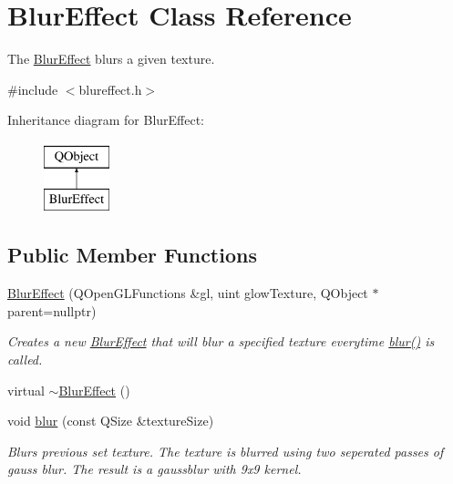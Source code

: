 \hypertarget{class_blur_effect}{\section{Blur\+Effect Class Reference}
\label{class_blur_effect}
}


The \hyperlink{class_blur_effect}{Blur\+Effect} blurs a given texture.  




{\ttfamily \#include $<$blureffect.\+h$>$}

Inheritance diagram for Blur\+Effect\+:\begin{figure}[H]
\begin{center}
\leavevmode
\includegraphics[height=2.000000cm]{class_blur_effect}
\end{center}
\end{figure}
\subsection*{Public Member Functions}
\begin{DoxyCompactItemize}
\item 
\hyperlink{class_blur_effect_a3653fdf73228f64b5fab03589060c704}{Blur\+Effect} (Q\+Open\+G\+L\+Functions \&gl, uint glow\+Texture, Q\+Object $\ast$parent=nullptr)
\begin{DoxyCompactList}\small\item\em Creates a new \hyperlink{class_blur_effect}{Blur\+Effect} that will blur a specified texture everytime \hyperlink{class_blur_effect_a0317d7ce7078d1e28e7e5b37fb60b9f3}{blur()} is called. \end{DoxyCompactList}\item 
virtual \hyperlink{class_blur_effect_aeb30b45dd769774ff0f0706a4ad6566c}{$\sim$\+Blur\+Effect} ()
\item 
void \hyperlink{class_blur_effect_a0317d7ce7078d1e28e7e5b37fb60b9f3}{blur} (const Q\+Size \&texture\+Size)
\begin{DoxyCompactList}\small\item\em Blurs previous set texture.  The texture is blurred using two seperated passes of gauss blur. The result is a gaussblur with 9x9 kernel. \end{DoxyCompactList}\end{DoxyCompactItemize}

